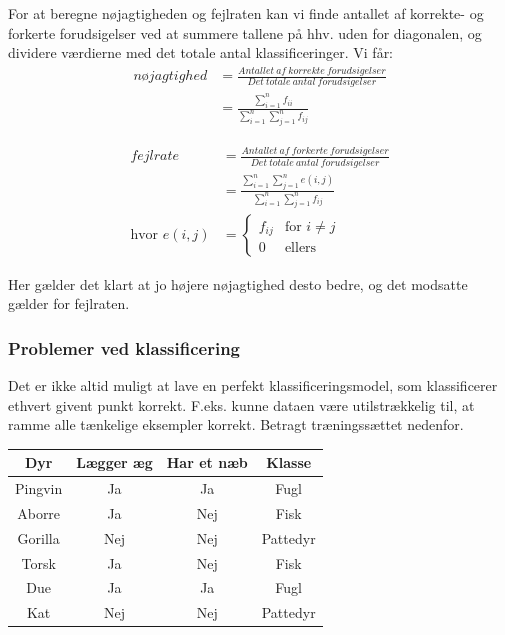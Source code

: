 \documentclass{article}
\begin{document}
For at beregne nøjagtigheden og fejlraten kan vi finde antallet af korrekte- og forkerte forudsigelser ved at summere tallene på hhv. uden for diagonalen, og dividere værdierne med det totale antal klassificeringer. Vi får:\\

\begin{align*}
nøjagtighed &= \frac{Antallet \ af \ korrekte \ forudsigelser}{Det \ totale \ antal \ forudsigelser} \\
         &= \frac{\sum_{i=1}^{n}f_{ii}}{\sum_{i=1}^{n}\sum_{j=1}^{n}f_{ij}}
\end{align*}

\begin{align*}
fejlrate &= \frac{Antallet \ af \ forkerte \ forudsigelser}{Det \ totale \ antal \ forudsigelser} \\
           &= \frac{\sum_{i=1}^{n}\sum_{j=1}^{n}e(i,j)}{\sum_{i=1}^{n}\sum_{j=1}^{n}f_{ij}}\\
           \text{hvor }e(i,j)&=
           \begin{cases} f_{ij} & \text{for } i\neq j \\
           0                                    & \text{ellers}      %
           \end{cases}
\end{align*}


Her gælder det klart at jo højere nøjagtighed desto bedre, og det modsatte gælder for fejlraten. \\

\subsubsection{Problemer ved klassificering}
Det er ikke altid muligt at lave en perfekt klassificeringsmodel, som klassificerer ethvert givent punkt korrekt. F.eks. kunne dataen være utilstrækkelig til, at ramme alle tænkelige eksempler korrekt. Betragt træningssættet nedenfor. 

\begin{tabular}{c|c|c|c}
	Dyr & Lægger æg & Har et næb & Klasse\\
	\hline
	Pingvin & Ja & Ja & Fugl\\
	Aborre & Ja & Nej & Fisk\\
	Gorilla & Nej & Nej & Pattedyr\\
	Torsk & Ja & Nej & Fisk\\
	Due & Ja & Ja & Fugl\\
	Kat & Nej & Nej & Pattedyr
\end{tabular}
\end{document}
